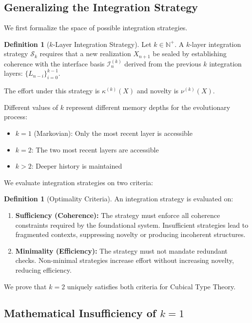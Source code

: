 \documentclass[11pt]{article}
\theoremstyle{definition}
\newtheorem{definition}[theorem]{Definition}
\theoremstyle{remark}
\begin{document}
\subsection{Generalizing the Integration Strategy}

We first formalize the space of possible integration strategies.

\begin{definition}[$k$-Layer Integration Strategy]
Let $k \in \mathbb{N}^+$. A $k$-layer integration strategy $\mathcal{S}_k$ requires that a new realization
$X_{n+1}$ be sealed by establishing coherence with the interface basis $\mathcal{I}_n^{(k)}$ derived from the
previous $k$ integration layers: $\{L_{n-i}\}_{i=0}^{k-1}$.

The effort under this strategy is $\kappa^{(k)}(X)$ and novelty is $\nu^{(k)}(X)$.
\end{definition}

Different values of $k$ represent different memory depths for the evolutionary process:
\begin{itemize}
\item $k = 1$ (Markovian): Only the most recent layer is accessible
\item $k = 2$: The two most recent layers are accessible
\item $k > 2$: Deeper history is maintained
\end{itemize}

We evaluate integration strategies on two criteria:

\begin{definition}[Optimality Criteria]
An integration strategy is evaluated on:
\begin{enumerate}
\item \textbf{Sufficiency (Coherence):} The strategy must enforce all coherence constraints required
by the foundational system. Insufficient strategies lead to fragmented contexts, suppressing
novelty or producing incoherent structures.
\item \textbf{Minimality (Efficiency):} The strategy must not mandate redundant checks. Non-minimal
strategies increase effort without increasing novelty, reducing efficiency.
\end{enumerate}
\end{definition}

We prove that $k = 2$ uniquely satisfies both criteria for Cubical Type Theory.

\subsection{Mathematical Insufficiency of $k = 1$}
\end{document}
